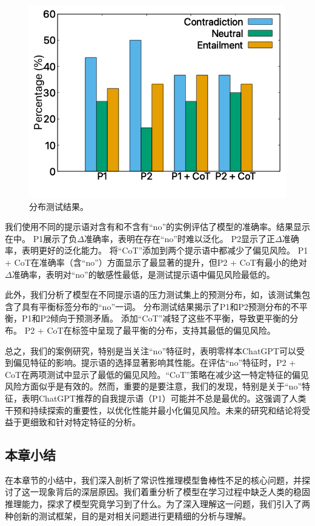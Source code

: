 \begin{figure}[th]
\centering
\includegraphics[width=0.6\columnwidth]{figures/emnlp/data/cue.png}
\caption{分布测试结果。}
\label{fig4:cue_chatgpt}
\end{figure}



我们使用不同的提示语对含有和不含有``no''的实例评估了模型的准确率。结果显示在中。
P1展示了负$\Delta$准确率，表明在存在``no''时难以泛化。
P2显示了正$\Delta$准确率，表明更好的泛化能力。
将``CoT''添加到两个提示语中都减少了偏见风险。
P1 + CoT在准确率（含``no''）方面显示了最显著的提升，但P2 + CoT有最小的绝对
$\Delta$准确率，表明对``no''的敏感性最低，是测试提示语中偏见风险最低的。

此外，我们分析了模型在不同提示语的压力测试集上的预测分布，如，该测试集包含了具有平衡标签分布的``no''一词。
分布测试结果揭示了P1和P2预测分布的不平衡，P1和P2倾向于预测矛盾。
添加``CoT''减轻了这些不平衡，导致更平衡的分布。
P2 + CoT在标签中呈现了最平衡的分布，支持其最低的偏见风险。

总之，我们的案例研究，特别是当关注``no''特征时，表明零样本ChatGPT可以受到偏见特征的影响。提示语的选择显著影响其性能。在评估``no''特征时，P2 + CoT在两项测试中显示了最低的偏见风险。``CoT''策略在减少这一特定特征的偏见风险方面似乎是有效的。然而，重要的是要注意，我们的发现，特别是关于``no''特征，表明ChatGPT推荐的自我提示语（P1）可能并不总是最优的。这强调了人类干预和持续探索的重要性，以优化性能并最小化偏见风险。未来的研究和结论将受益于更细致和针对特定特征的分析。

        

\subsection{本章小结}

在本章节的小结中，我们深入剖析了常识性推理模型鲁棒性不足的核心问题，并探讨了这一现象背后的深层原因。我们着重分析了模型在学习过程中缺乏人类的稳固推理能力，探求了模型究竟学习到了什么。为了深入理解这一问题，我们引入了两种创新的测试框架，目的是对相关问题进行更精细的分析与理解。

